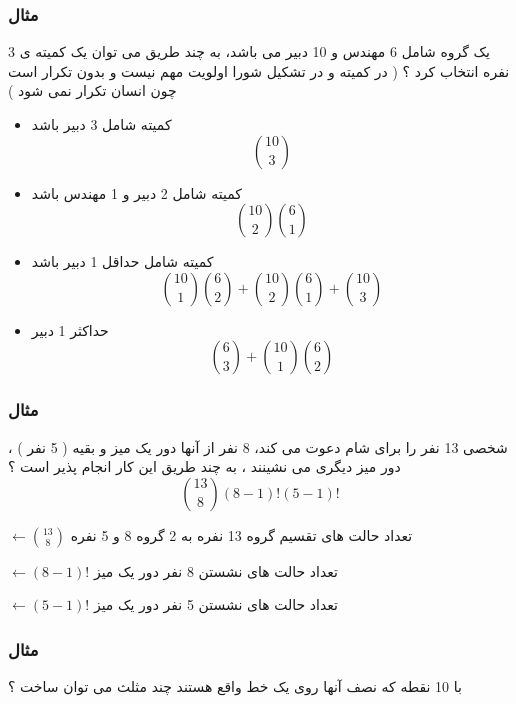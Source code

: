\documentclass[12pt]{book}
\begin{document}
\subsubsection{مثال}
یک گروه شامل 6 مهندس و 10 دبیر می باشد، به چند طریق می توان یک کمیته ی 3 نفره انتخاب کرد ؟
( در کمیته و در تشکیل شورا اولویت مهم نیست و بدون تکرار است چون انسان تکرار نمی شود )

\begin{itemize}
	\item کمیته شامل 3 دبیر باشد
	$$
	\binom{10}{3}
	$$
	\item کمیته شامل 2 دبیر و 1 مهندس باشد
	$$
	\binom{10}{2} \binom{6}{1}
	$$
	\item کمیته شامل حداقل 1 دبیر باشد
	$$
	\binom{10}{1} \binom{6}{2} + \binom{10}{2} \binom{6}{1} + \binom{10}{3}
	$$
	\item حداکثر 1 دبیر
	$$
	\binom{6}{3} + \binom{10}{1} \binom{6}{2}
	$$
\end{itemize}


\subsubsection{مثال}
شخصی 13 نفر را برای شام دعوت می کند، 8 نفر از آنها دور یک میز و بقیه ( 5 نفر ) ، دور میز دیگری می نشینند ، به چند طریق این کار انجام پذیر است ؟
$$
\binom{13}{8} (8-1)! (5-1)!
$$

$\leftarrow \binom{13}{8}  $ تعداد حالت های تقسیم گروه 13 نفره به 2 گروه 8 و 5 نفره

$\leftarrow (8-1)! $ تعداد حالت های نشستن 8 نفر دور یک میز

$\leftarrow (5-1)!$  تعداد حالت های نشستن 5 نفر دور یک میز



\subsubsection{مثال}
با 10 نقطه که نصف آنها روی یک خط واقع هستند چند مثلث می توان ساخت ؟\newline\newline

\end{document}
